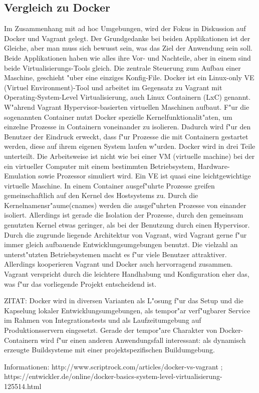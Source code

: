 \subsection{Vergleich zu Docker}
Im Zusammenhang mit ad hoc Umgebungen, wird der Fokus in Diskussion auf Docker und Vagrant gelegt.
Der Grundgedanke bei beiden Applikationen ist der Gleiche, aber man muss sich bewusst sein, was das Ziel der Anwendung sein soll.
Beide Applikationen haben wie alles ihre Vor- und Nachteile, aber in einem sind beide Virtualisierungs-Tools gleich. Die zentrale Steuerung zum Aufbau einer Maschine, geschieht "uber eine einziges Konfig-File.\newline
Docker ist ein Linux-only VE (Virtuel Environment)-Tool und arbeitet im Gegensatz zu Vagrant mit Operating-System-Level Virtualisierung, auch Linux Containern (LxC) genannt. W"ahrend Vagrant Hypervisor-basierten virtuellen Maschinen aufbaut.
F"ur die sogenannten Container nutzt Docker spezielle Kernelfunktionalit"aten, um einzelne Prozesse in Containern voneinander zu isolieren.\newline 
Dadurch wird f"ur den Benutzer der Eindruck erweckt, dass f"ur Prozesse die mit Containern gestartet werden, diese auf ihrem eigenen System laufen w"urden.
Docker wird in drei Teile unterteilt. Die Arbeitsweise ist nicht wie bei einer VM (virtuelle machine) bei der ein virtueller Computer mit einem bestimmten Betriebsystem, Hardware-Emulation sowie Prozessor simuliert wird. Ein VE ist quasi eine leichtgewichtige virtuelle Maschine. In einem Container ausgef"uhrte Prozesse greifen gemeinschaftlich auf den Kernel des Hostsystems zu. Durch die Kernelnamensr"aume(cnames) werden die ausgef"uhrten Prozesse von einander isoliert. Allerdings ist gerade die Isolation der Prozesse, durch den gemeinsam genutzten Kernel etwas geringer, als bei der Benutzung durch einen Hypervisor.\newline
Durch die zugrunde liegende Architektur von Vagrant, wird Vagrant gerne f"ur immer gleich aufbauende Entwicklungsumgebungen benutzt.
Die vielzahl an unterst"utzten Betriebsystemen macht es f"ur viele Benutzer attraktiver. Allerdings kooperieren Vagrant und Docker auch hervorragend zusammen.
Vagrant verspricht durch die leichtere Handhabung und Konfiguration eher das, was f"ur das vorliegende Projekt entscheidend ist.



ZITAT: Docker wird in diversen Varianten als L"osung f"ur das Setup und die Kapselung lokaler Entwicklungsumgebungen, als tempor"ar verf"ugbarer Service im Rahmen von Integrationstests und als Laufzeitumgebung auf Produktionsservern eingesetzt. Gerade der tempor"are Charakter von Docker-Containern wird f"ur einen anderen Anwendungsfall interessant: als dynamisch erzeugte Buildsysteme mit einer projektspezifischen Buildumgebung.

Informationen: http://www.scriptrock.com/articles/docker-vs-vagrant ; https://entwickler.de/online/docker-basics-system-level-virtualisierung-125514.html\newline






